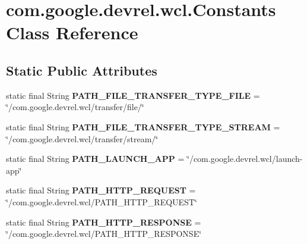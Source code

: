 \hypertarget{classcom_1_1google_1_1devrel_1_1wcl_1_1Constants}{}\section{com.\+google.\+devrel.\+wcl.\+Constants Class Reference}
\label{classcom_1_1google_1_1devrel_1_1wcl_1_1Constants}
\subsection*{Static Public Attributes}
\begin{DoxyCompactItemize}
\item 
static final String {\bfseries P\+A\+T\+H\+\_\+\+F\+I\+L\+E\+\_\+\+T\+R\+A\+N\+S\+F\+E\+R\+\_\+\+T\+Y\+P\+E\+\_\+\+F\+I\+LE} = \char`\"{}/com.\+google.\+devrel.\+wcl/transfer/file/\char`\"{}\hypertarget{classcom_1_1google_1_1devrel_1_1wcl_1_1Constants_a4702374256901aaf5e47bb2390b0257f}{}\label{classcom_1_1google_1_1devrel_1_1wcl_1_1Constants_a4702374256901aaf5e47bb2390b0257f}

\item 
static final String {\bfseries P\+A\+T\+H\+\_\+\+F\+I\+L\+E\+\_\+\+T\+R\+A\+N\+S\+F\+E\+R\+\_\+\+T\+Y\+P\+E\+\_\+\+S\+T\+R\+E\+AM} = \char`\"{}/com.\+google.\+devrel.\+wcl/transfer/stream/\char`\"{}\hypertarget{classcom_1_1google_1_1devrel_1_1wcl_1_1Constants_a85c61122e5b794b8b598192c6bf8a94c}{}\label{classcom_1_1google_1_1devrel_1_1wcl_1_1Constants_a85c61122e5b794b8b598192c6bf8a94c}

\item 
static final String {\bfseries P\+A\+T\+H\+\_\+\+L\+A\+U\+N\+C\+H\+\_\+\+A\+PP} = \char`\"{}/com.\+google.\+devrel.\+wcl/launch-\/app\char`\"{}\hypertarget{classcom_1_1google_1_1devrel_1_1wcl_1_1Constants_a1538207c971f85a7581a2dfaccaba21a}{}\label{classcom_1_1google_1_1devrel_1_1wcl_1_1Constants_a1538207c971f85a7581a2dfaccaba21a}

\item 
static final String {\bfseries P\+A\+T\+H\+\_\+\+H\+T\+T\+P\+\_\+\+R\+E\+Q\+U\+E\+ST} = \char`\"{}/com.\+google.\+devrel.\+wcl/P\+A\+T\+H\+\_\+\+H\+T\+T\+P\+\_\+\+R\+E\+Q\+U\+E\+ST\char`\"{}\hypertarget{classcom_1_1google_1_1devrel_1_1wcl_1_1Constants_ac0cdd4f8049c159a3f4cb3d231c51880}{}\label{classcom_1_1google_1_1devrel_1_1wcl_1_1Constants_ac0cdd4f8049c159a3f4cb3d231c51880}

\item 
static final String {\bfseries P\+A\+T\+H\+\_\+\+H\+T\+T\+P\+\_\+\+R\+E\+S\+P\+O\+N\+SE} = \char`\"{}/com.\+google.\+devrel.\+wcl/P\+A\+T\+H\+\_\+\+H\+T\+T\+P\+\_\+\+R\+E\+S\+P\+O\+N\+SE\char`\"{}\hypertarget{classcom_1_1google_1_1devrel_1_1wcl_1_1Constants_acd14f9da1d75645cc4ee47342af6c1e4}{}\label{classcom_1_1google_1_1devrel_1_1wcl_1_1Constants_acd14f9da1d75645cc4ee47342af6c1e4}


\end{DoxyCompactItemize}
